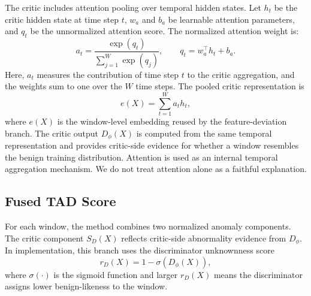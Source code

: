 The critic includes attention pooling over temporal hidden states. Let \(h_t\) be the critic hidden state at time step \(t\), \(w_a\) and \(b_a\) be learnable attention parameters, and \(q_t\) be the unnormalized attention score. The normalized attention weight is:
\begin{equation}
a_t=\frac{\exp(q_t)}{\sum_{j=1}^{W}\exp(q_j)}, \qquad q_t=w_a^\top h_t+b_a.
\end{equation}
Here, \(a_t\) measures the contribution of time step \(t\) to the critic aggregation, and the weights sum to one over the \(W\) time steps. The pooled critic representation is
\begin{equation}
e(X)=\sum_{t=1}^{W}a_t h_t,
\end{equation}
where \(e(X)\) is the window-level embedding reused by the feature-deviation branch. The critic output \(D_\phi(X)\) is computed from the same temporal representation and provides critic-side evidence for whether a window resembles the benign training distribution. Attention is used as an internal temporal aggregation mechanism. We do not treat attention alone as a faithful explanation.

\subsection{Fused TAD Score}

For each window, the method combines two normalized anomaly components. The critic component \(S_D(X)\) reflects critic-side abnormality evidence from \(D_\phi\). In implementation, this branch uses the discriminator unknownness score
\begin{equation}
r_D(X)=1-\sigma(D_\phi(X)),
\end{equation}
where \(\sigma(\cdot)\) is the sigmoid function and larger \(r_D(X)\) means the discriminator assigns lower benign-likeness to the window.

